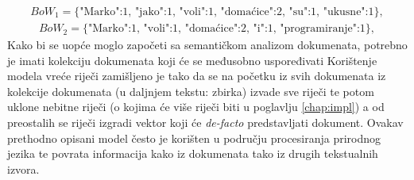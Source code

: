 \documentclass[times, utf8, zavrsni]{fer}
\begin{document}
\begin{align*}
{{BoW_{1}}=\{\text{{"Marko":1, "jako":1, "voli":1, "domaćice":2, "su":1, "ukusne":1}}}\},
\end{align*}
\begin{align*}
{{BoW_{2}}=\{\text{{"Marko":1, "voli":1, "domaćice":2, "i":1, "programiranje":1}}}\},
\end{align*}
Kako bi se uopće moglo započeti sa semantičkom analizom dokumenata, potrebno je imati kolekciju dokumenata koji će se međusobno uspoređivati
Korištenje modela vreće riječi zamišljeno je tako da se na početku iz svih dokumenata iz kolekcije dokumenata (u daljnjem tekstu: zbirka) izvade sve riječi te potom uklone nebitne riječi (o kojima će više riječi biti u poglavlju \ref{chap:impl}) a od preostalih se riječi izgradi vektor koji će \textit{de-facto} predstavljati dokument. Ovakav prethodno opisani model često je korišten u području procesiranja prirodnog jezika te povrata informacija kako iz dokumenata tako iz drugih tekstualnih izvora.
\end{document}
